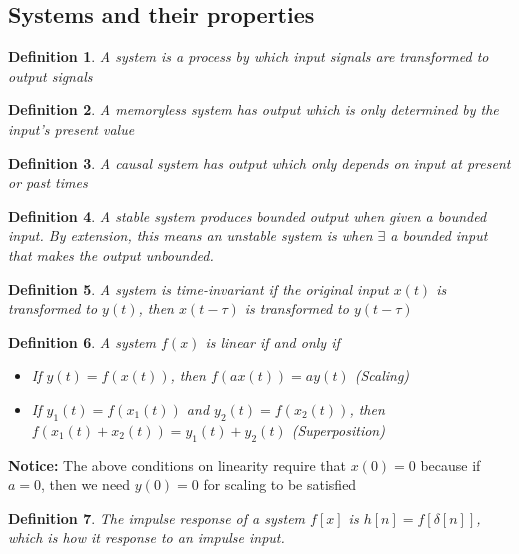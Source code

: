 \documentclass{article}
\newtheorem{definition}{Definition}
\begin{document}
\subsection{Systems and their properties}
\begin{definition}
    A system is a process by which input signals are transformed to output signals
\end{definition}
\begin{definition}
    A memoryless system has output which is only determined by the input's present value
\end{definition}
\begin{definition}
    A causal system has output which only depends on input at present or past times
\end{definition}
\begin{definition}
    A stable system produces bounded output when given a bounded input. By extension,
    this means an unstable system is when $\exists$ a bounded input that makes the output unbounded.
\end{definition}
\begin{definition}
    A system is time-invariant if the original input $x(t)$ is transformed to $y(t)$, then
    $x(t-\tau)$ is transformed to $y(t-\tau)$
\end{definition}
\begin{definition}
    A system $f(x)$ is linear if and only if
    \begin{itemize}
        \item If $y(t) = f(x(t))$, then $f(a x(t)) = a y(t)$ (Scaling)
        \item If $y_1(t) = f(x_1(t))$ and $y_2(t) = f(x_2(t))$, then $f(x_1(t) + x_2(t)) = y_1(t) + y_2(t)$ (Superposition)
    \end{itemize}
\end{definition}
\textbf{Notice: } The above conditions on linearity require that $x(0) = 0$ because if $a = 0$, then we need $y(0) = 0$ for scaling to be satisfied
\begin{definition}
    The impulse response of a system $f[x]$ is $h[n] = f[\delta[n]]$, which is how it response to an impulse input. 
\end{definition}
\end{document}
